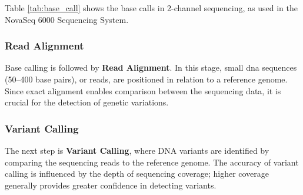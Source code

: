 Table \ref{tab:base_call} shows the base calls in 2-channel sequencing, as used in the NovaSeq 6000 Sequencing System.

\begin{table}[H]
    \centering
    \caption{Base Calls in 2-Channel Sequencing (NovaSeq 6000 - Illumina). Table from \cite{NovaSeq}}
    \label{tab:base_call}
\end{table}


\subsubsection{\textbf{Read Alignment}} \label{subsubsec:ngs_alignment}

Base calling is followed by \textbf{Read Alignment}. In this stage, small \ac{dna} sequences (50–400 base pairs), or reads, are positioned in relation to a reference genome. Since exact alignment enables comparison between the sequencing data, it is crucial for the detection of genetic variations. \cite{Rehm2013}

\subsubsection{\textbf{Variant Calling}} \label{subsubsec:ngs_variantcalling}

The next step is \textbf{Variant Calling}, where DNA variants are identified by comparing the sequencing reads to the reference genome. The accuracy of variant calling is influenced by the depth of sequencing coverage; higher coverage generally provides greater confidence in detecting variants. \cite{Rehm2013}

